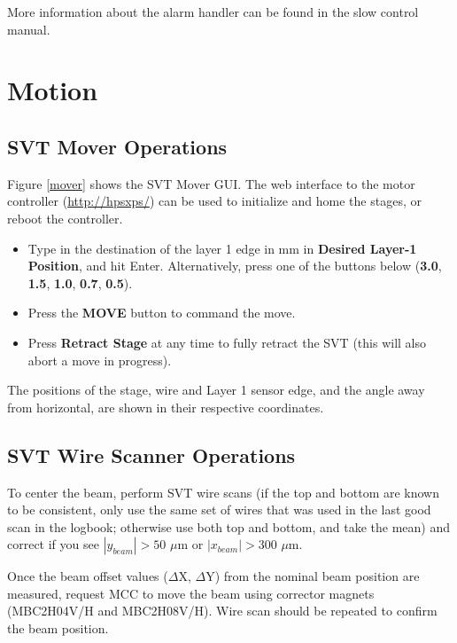 \documentclass[12pt]{report}
\begin{document}
More information about the alarm handler can be found in the slow control manual. 



\section{Motion}

\subsection{SVT Mover Operations}

Figure \ref{mover} shows the SVT Mover GUI.
The web interface to the motor controller (\url{http://hpsxps/}) can be used to initialize and home the stages, or reboot the controller.

\begin{itemize}
\item
Type in the destination of the layer 1 edge in mm in \textbf{Desired Layer-1 Position}, and hit Enter. Alternatively, press one of the buttons below (\textbf{3.0}, \textbf{1.5}, \textbf{1.0}, \textbf{0.7}, \textbf{0.5}).
\item Press the \textbf{MOVE} button to command the move.
\item Press \textbf{Retract Stage} at any time to fully retract the SVT (this will also abort a move in progress).
\end{itemize}

The positions of the stage, wire and Layer 1 sensor edge, and the angle away from horizontal, are shown in their respective coordinates.

\subsection{SVT Wire Scanner Operations}
\label{sec:wirescan}

To center the beam, perform SVT wire scans (if the top and bottom are known to be consistent, only use the same set of wires that was used in the last good scan in the logbook; otherwise use both top and bottom, and take the mean) and correct if you see $|y_{beam}| > 50$ $\mu$m or $|x_{beam}| > 300$ $\mu$m.

Once the beam offset values ($\Delta$X, $\Delta$Y) from the nominal beam position are measured, request MCC to move the beam using corrector magnets (MBC2H04V/H and MBC2H08V/H). Wire scan should be repeated to confirm the beam position.
\end{document}
